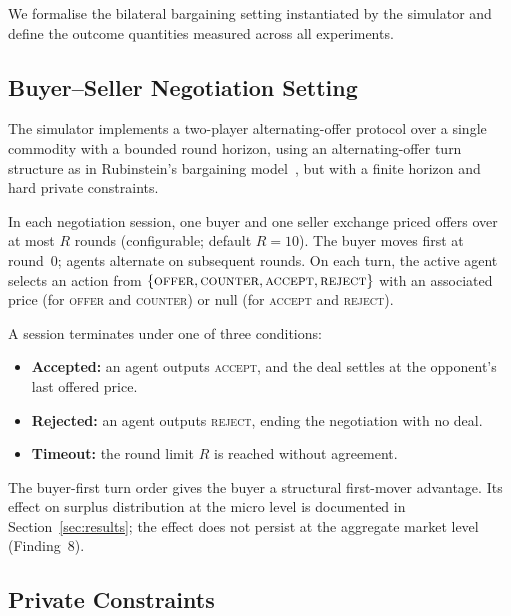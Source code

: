 
\label{sec:formulation}

We formalise the bilateral bargaining setting instantiated by the simulator and define the outcome quantities measured across all experiments.

\subsection{Buyer--Seller Negotiation Setting}
\label{sec:setting}

The simulator implements a two-player alternating-offer protocol over a single commodity with a bounded round horizon, using an alternating-offer turn structure as in Rubinstein's bargaining model~\cite{rubinstein1982}, but with a finite horizon and hard private constraints.

In each negotiation session, one buyer and one seller exchange priced offers over at most $R$ rounds (configurable; default $R{=}10$).  The buyer moves first at round~0; agents alternate on subsequent rounds.  On each turn, the active agent selects an action from $\{\textsc{offer}, \textsc{counter}, \textsc{accept}, \textsc{reject}\}$ with an associated price (for \textsc{offer} and \textsc{counter}) or null (for \textsc{accept} and \textsc{reject}).

A session terminates under one of three conditions:
\begin{itemize}
    \item \textbf{Accepted:} an agent outputs \textsc{accept}, and the deal settles at the opponent's last offered price.
    \item \textbf{Rejected:} an agent outputs \textsc{reject}, ending the negotiation with no deal.
    \item \textbf{Timeout:} the round limit $R$ is reached without agreement.
\end{itemize}

The buyer-first turn order gives the buyer a structural first-mover advantage.  Its effect on surplus distribution at the micro level is documented in Section~\ref{sec:results}; the effect does not persist at the aggregate market level (Finding~8).

\subsection{Private Constraints}
\label{sec:constraints}

